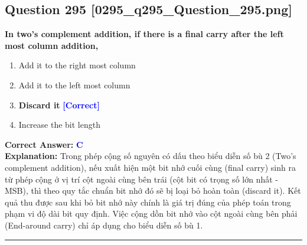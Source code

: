 \documentclass[11pt,a4paper]{article}
\begin{document}
\begin{minipage}{\textwidth}
\subsection*{Question 295 \quad \footnotesize{[0295\_q295\_Question\_295.png]}}
\noindent \textbf{In two's complement addition, if there is a final carry after the left most column addition,}

\begin{enumerate}[label=\Alph*.]
    \item Add it to the right most column
    \item Add it to the left most column
    \item \textbf{Discard it} \hfill \textcolor{blue}{\textbf{[Correct]}}
    \item Increase the bit length
\end{enumerate}

\noindent \textbf{Correct Answer:} \textcolor{blue}{\textbf{C}} \\[2pt]
\noindent \textbf{Explanation:} Trong phép cộng số nguyên có dấu theo biểu diễn số bù 2 (Two's complement addition), nếu xuất hiện một bit nhớ cuối cùng (final carry) sinh ra từ phép cộng ở vị trí cột ngoài cùng bên trái (cột bit có trọng số lớn nhất - MSB), thì theo quy tắc chuẩn bit nhớ đó sẽ bị loại bỏ hoàn toàn (discard it). Kết quả thu được sau khi bỏ bit nhớ này chính là giá trị đúng của phép toán trong phạm vi độ dài bit quy định. Việc cộng dồn bit nhớ vào cột ngoài cùng bên phải (End-around carry) chỉ áp dụng cho biểu diễn số bù 1.

\par\vspace{0.3cm}
\hrule
\vspace{0.3cm}
\end{minipage}
\end{document}

